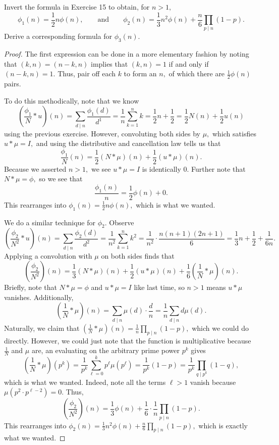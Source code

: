 \begin{exercise}
Invert the formula in Exercise 15 to obtain, for $n>1,$
\[\phi_1(n)=\frac12n\phi(n),\qquad\text{and}\qquad\phi_2(n)=\frac13n^2\phi(n)+\frac n6\prod_{p\mid n}(1-p).\]
Derive a corresponding formula for $\phi_3(n).$
\end{exercise}

\begin{proof}
The first expression can be done in a more elementary fashion by noting that $(k,n)=(n-k,n)$ implies that $(k,n)=1$ if and only if $(n-k,n)=1.$ Thus, pair off each $k$ to form an $n,$ of which there are $\frac12\phi(n)$ pairs.

To do this methodically, note that we know
\[\left(\frac{\phi_1}N*u\right)(n)=\sum_{d\mid n}\frac{\phi_1(d)}{d^1}=\frac1n\sum_{k=1}^nk=\frac12n+\frac12=\frac12N(n)+\frac12u(n)\]
using the previous exercise. However, convoluting both sides by $\mu,$ which satisfies $u*\mu=I,$ and using the distributive and cancellation law tells us that
\[\frac{\phi_1}N(n)=\frac12(N*\mu)(n)+\frac12(u*\mu)(n).\]
Because we asserted $n>1,$ we see $u*\mu=I$ is identically 0. Further note that $N*\mu=\phi,$ so we see that
\[\frac{\phi_1(n)}n=\frac12\phi(n)+0.\]
This rearranges into $\phi_1(n)=\frac12n\phi(n),$ which is what we wanted.

We do a similar technique for $\phi_2.$ Observe
\[\left(\frac{\phi_2}{N^2}*u\right)(n)=\sum_{d\mid n}\frac{\phi_2(d)}{d^2}=\frac1{n^2}\sum_{k=1}^nk^2=\frac1{n^2}\cdot\frac{n(n+1)(2n+1)}6=\frac13n+\frac12+\frac1{6n}.\]
Applying a convolution with $\mu$ on both sides finds that
\[\left(\frac{\phi_2}{N^2}\right)(n)=\frac13(N*\mu)(n)+\frac12(u*\mu)(n)+\frac16\left(\frac1N*\mu\right)(n).\]
Briefly, note that $N*\mu=\phi$ and $u*\mu=I$ like last time, so $n>1$ means $u*\mu$ vanishes. Additionally,
\[\left(\frac1N*\mu\right)(n)=\sum_{d\mid n}\mu(d)\cdot\frac dn=\frac1n\sum_{d\mid n}d\mu(d).\]
Naturally, we claim that $\left(\frac1N*\mu\right)(n)=\frac1n\prod_{p\mid n}(1-p),$ which we could do directly. However, we could just note that the function is multiplicative because $\frac1N$ and $\mu$ are, an evaluating on the arbitrary prime power $p^k$ gives
\[\left(\frac1N*\mu\right)\left(p^k\right)=\frac1{p^k}\sum_{\ell=0}^kp^\ell\mu\left(p^\ell\right)=\frac1{p^k}(1-p)=\frac1{p^k}\prod_{q\mid p^k}(1-q),\]
which is what we wanted. Indeed, note all the terms $\ell>1$ vanish because $\mu\left(p^2\cdot p^{\ell-2}\right)=0.$ Thus,
\[\left(\frac{\phi_2}{N^2}\right)(n)=\frac13\phi(n)+\frac16\cdot\frac1n\prod_{p\mid n}(1-p).\]
This rearranges into $\phi_2(n)=\frac13n^2\phi(n)+\frac n6\prod_{p\mid n}(1-p),$ which is exactly what we wanted.


\end{proof}

